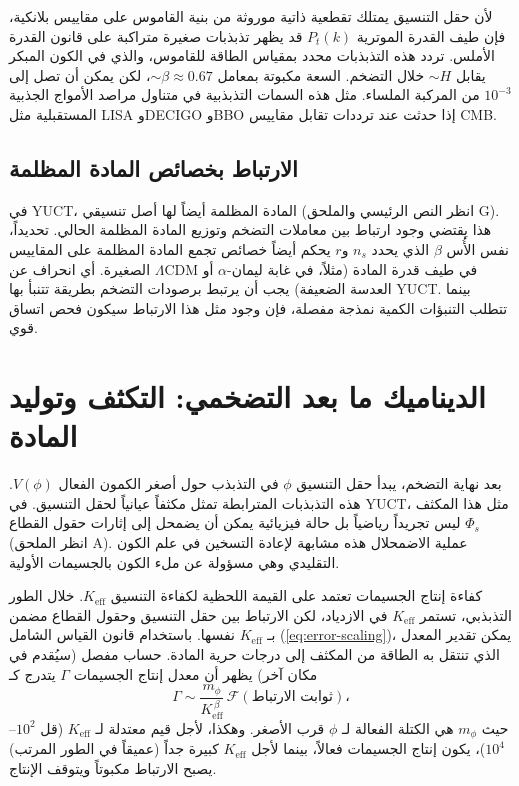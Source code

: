 \documentclass[12pt,a4paper]{article}
\newcommand{\Keff}{K_{\mathrm{eff}}}
\begin{document}
	لأن حقل التنسيق يمتلك تقطعية ذاتية موروثة من بنية القاموس على مقاييس بلانكية، فإن طيف القدرة الموترية \(P_t(k)\) قد يظهر تذبذبات صغيرة متراكبة على قانون القدرة الأملس. تردد هذه التذبذبات محدد بمقياس الطاقة للقاموس، والذي في الكون المبكر يقابل \(\sim H\) خلال التضخم. السعة مكبوتة بمعامل \(\sim \beta \approx 0.67\)، لكن يمكن أن تصل إلى \(10^{-3}\) من المركبة الملساء. مثل هذه السمات التذبذبية في متناول مراصد الأمواج الجذبية المستقبلية مثل LISA وDECIGO وBBO إذا حدثت عند ترددات تقابل مقاييس CMB.
	
	\subsection{الارتباط بخصائص المادة المظلمة}
	
	في YUCT، المادة المظلمة أيضاً لها أصل تنسيقي (انظر النص الرئيسي والملحق G). هذا يقتضي وجود ارتباط بين معاملات التضخم وتوزيع المادة المظلمة الحالي. تحديداً، نفس الأُس \(\beta\) الذي يحدد \(n_s\) و\(r\) يحكم أيضاً خصائص تجمع المادة المظلمة على المقاييس الصغيرة. أي انحراف عن \(\Lambda\)CDM في طيف قدرة المادة (مثلاً، في غابة ليمان-\(\alpha\) أو العدسة الضعيفة) يجب أن يرتبط برصودات التضخم بطريقة تتنبأ بها YUCT. بينما تتطلب التنبؤات الكمية نمذجة مفصلة، فإن وجود مثل هذا الارتباط سيكون فحص اتساق قوي.
	
	\section{الديناميك ما بعد التضخمي: التكثف وتوليد المادة}
	\label{sec:postinflation}
	
	بعد نهاية التضخم، يبدأ حقل التنسيق \(\phi\) في التذبذب حول أصغر الكمون الفعال \(V(\phi)\). هذه التذبذبات المترابطة تمثل مكثفاً عيانياً لحقل التنسيق. في YUCT، مثل هذا المكثف ليس تجريداً رياضياً بل حالة فيزيائية يمكن أن يضمحل إلى إثارات حقول القطاع \(\Phi_s\) (انظر الملحق A). عملية الاضمحلال هذه مشابهة لإعادة التسخين في علم الكون التقليدي وهي مسؤولة عن ملء الكون بالجسيمات الأولية.
	
	كفاءة إنتاج الجسيمات تعتمد على القيمة اللحظية لكفاءة التنسيق \(\Keff\). خلال الطور التذبذبي، تستمر \(\Keff\) في الازدياد، لكن الارتباط بين حقل التنسيق وحقول القطاع مضمن بـ \(\Keff\) نفسها. باستخدام قانون القياس الشامل (\ref{eq:error-scaling})، يمكن تقدير المعدل الذي تنتقل به الطاقة من المكثف إلى درجات حرية المادة. حساب مفصل (سيُقدم في مكان آخر) يظهر أن معدل إنتاج الجسيمات \(\Gamma\) يتدرج كـ
	\begin{equation}
		\Gamma \sim \frac{m_\phi}{\Keff^{\,\beta}} \, \mathcal{F}(\text{ثوابت الارتباط})،
		\label{eq:gamma}
	\end{equation}
	حيث \(m_\phi\) هي الكتلة الفعالة لـ \(\phi\) قرب الأصغر. وهكذا، لأجل قيم معتدلة لـ \(\Keff\) (قل \(10^2\)–\(10^4\))، يكون إنتاج الجسيمات فعالاً، بينما لأجل \(\Keff\) كبيرة جداً (عميقاً في الطور المرتب) يصبح الارتباط مكبوتاً ويتوقف الإنتاج.
	
\end{document}
